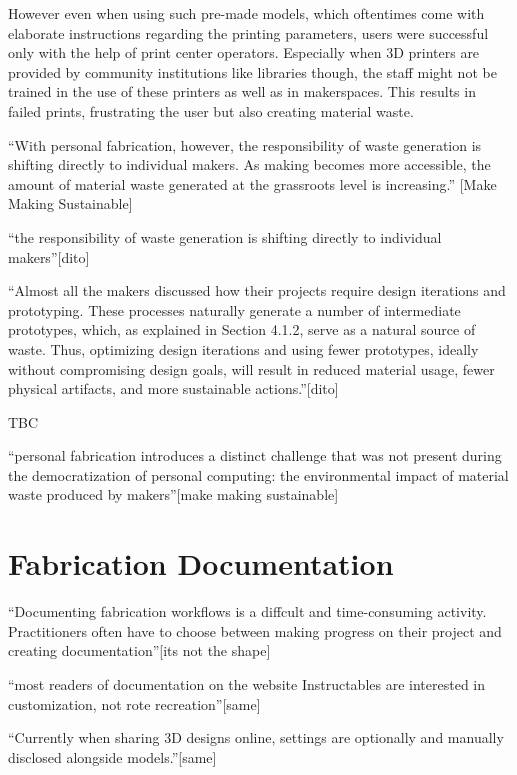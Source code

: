 However even when using such pre-made models, which oftentimes come with elaborate instructions regarding the printing parameters, users were successful only with the help of print center operators. 
Especially when 3D printers are provided by community institutions like libraries though, the staff might not be trained in the use of these printers as well as in makerspaces.
This results in failed prints, frustrating the user but also creating material waste. 


``With personal fabrication, however, the responsibility of waste generation is shifting directly to individual makers. As making becomes more accessible, the amount of material waste generated at the grassroots level is increasing.'' [Make Making Sustainable]

``the responsibility of waste generation is shifting directly to individual makers''[dito]

``Almost all the makers discussed how their projects require design iterations and prototyping. These processes naturally generate a number of intermediate prototypes, which, as explained in Section 4.1.2, serve as a natural source of waste. Thus, optimizing design iterations and using fewer prototypes, ideally without compromising design goals, will result in reduced material usage, fewer physical artifacts, and more sustainable actions.''[dito]

TBC




``personal fabrication introduces a distinct challenge that was not present during the democratization of personal computing: the environmental impact of material waste produced by makers''[make making sustainable]

\section{Fabrication Documentation}

``Documenting fabrication workflows is a diffcult and time-consuming activity. Practitioners often have to choose between making progress on their project and creating documentation''[its not the shape]

``most readers of documentation on the website Instructables are interested in customization, not rote recreation''[same]

``Currently when sharing 3D designs online, settings are optionally and manually disclosed alongside models.''[same]